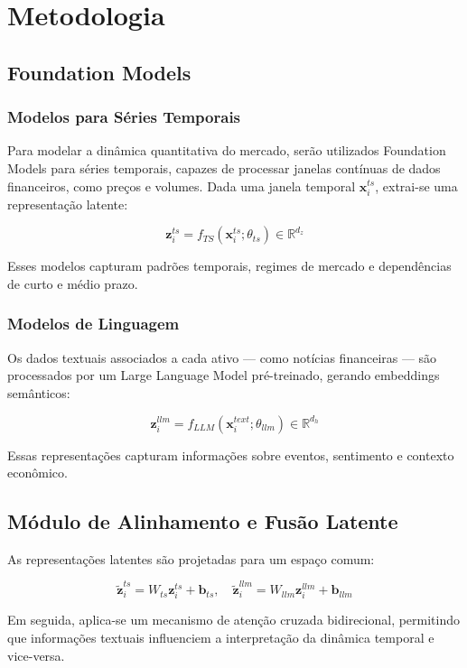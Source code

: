 \documentclass[11pt, a4paper]{article}
\begin{document}
\section{Metodologia}

\subsection{Foundation Models}

\subsubsection{Modelos para Séries Temporais}

Para modelar a dinâmica quantitativa do mercado, serão utilizados Foundation Models para séries temporais, capazes de processar janelas contínuas de dados financeiros, como preços e volumes. Dada uma janela temporal $\mathbf{x}_i^{ts}$, extrai-se uma representação latente:

\[
\mathbf{z}_i^{ts} = f_{TS}(\mathbf{x}_i^{ts}; \theta_{ts}) \in \mathbb{R}^{d_z}
\]

Esses modelos capturam padrões temporais, regimes de mercado e dependências de curto e médio prazo.

\subsubsection{Modelos de Linguagem}

Os dados textuais associados a cada ativo — como notícias financeiras — são processados por um Large Language Model pré-treinado, gerando embeddings semânticos:

\[
\mathbf{z}_i^{llm} = f_{LLM}(\mathbf{x}_i^{text}; \theta_{llm}) \in \mathbb{R}^{d_h}
\]

Essas representações capturam informações sobre eventos, sentimento e contexto econômico.

\subsection{Módulo de Alinhamento e Fusão Latente}

As representações latentes são projetadas para um espaço comum:

\[
\tilde{\mathbf{z}}_i^{ts} = W_{ts}\mathbf{z}_i^{ts} + \mathbf{b}_{ts}, \quad
\tilde{\mathbf{z}}_i^{llm} = W_{llm}\mathbf{z}_i^{llm} + \mathbf{b}_{llm}
\]

Em seguida, aplica-se um mecanismo de atenção cruzada bidirecional, permitindo que informações textuais influenciem a interpretação da dinâmica temporal e vice-versa.
\end{document}
